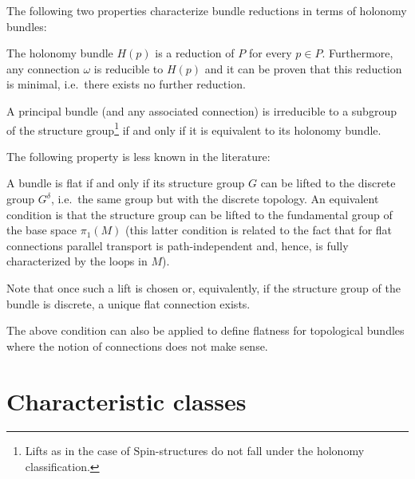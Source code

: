     The following two properties characterize bundle reductions in terms of holonomy bundles:
    \begin{property}
        The holonomy bundle $H(p)$ is a reduction of $P$ for every $p\in P$. Furthermore, any connection $\omega$ is reducible to $H(p)$ and it can be proven that this reduction is minimal, i.e.~there exists no further reduction.
    \end{property}
    \begin{result}\label{bundle:reducible_holonomy}
        A principal bundle (and any associated connection) is irreducible to a subgroup of the structure group\footnote{Lifts as in the case of $\mathrm{Spin}$-structures do not fall under the holonomy classification.} if and only if it is equivalent to its holonomy bundle.
    \end{result}

    The following property is less known in the literature:
    \begin{property}\label{bundle:flat_connection_cohomology}
        A bundle is flat if and only if its structure group $G$ can be lifted to the discrete group $G^\delta$, i.e.~the same group but with the discrete topology. An equivalent condition is that the structure group can be lifted to the fundamental group of the base space $\pi_1(M)$ (this latter condition is related to the fact that for flat connections parallel transport is path-independent and, hence, is fully characterized by the loops in $M$).

        Note that once such a lift is chosen or, equivalently, if the structure group of the bundle is discrete, a unique flat connection exists.
    \end{property}
    \begin{remark}
        The above condition can also be applied to define flatness for topological bundles where the notion of connections does not make sense.
    \end{remark}

\section{Characteristic classes}

